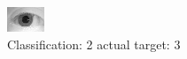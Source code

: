\begin{figure}[h!]
\begin{center}
\includegraphics[width=0.60\columnwidth]{figures/ID1074_class_2_target_3.png}
\end{center}
\caption{ Classification: 2 actual target: 3}
\label{fig:ID1074_class_2_target_3}
\end{figure}
